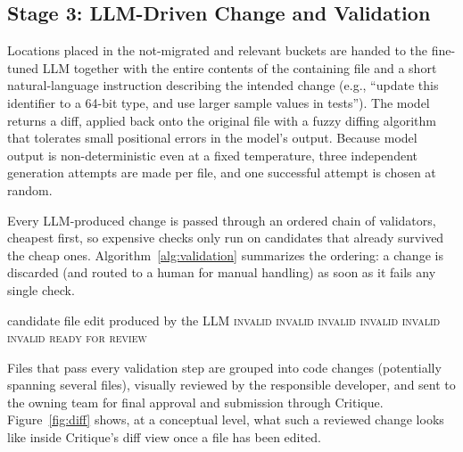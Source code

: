 \subsection{Stage 3: LLM-Driven Change and Validation}
Locations placed in the not-migrated and relevant buckets are handed
to the fine-tuned LLM together with the entire contents of the
containing file and a short natural-language instruction describing
the intended change (e.g., ``update this identifier to a 64-bit type,
and use larger sample values in tests''). The model returns a diff,
applied back onto the original file with a fuzzy diffing algorithm
that tolerates small positional errors in the model's output. Because
model output is non-deterministic even at a fixed temperature, three
independent generation attempts are made per file, and one successful
attempt is chosen at random.

Every LLM-produced change is passed through an ordered chain of
validators, cheapest first, so expensive checks only run on
candidates that already survived the cheap ones. Algorithm~\ref{alg:validation}
summarizes the ordering: a change is discarded (and routed to a human
for manual handling) as soon as it fails any single check.

\begin{algorithm}
\caption{Simplified change-validation pipeline based on Section 3.3 of the original paper.}
\label{alg:validation}
\begin{algorithmic}[1]
\Require candidate file edit produced by the LLM
  \State \Return \textsc{invalid}
  \State \Return \textsc{invalid}
  \State \Return \textsc{invalid}
  \State \Return \textsc{invalid}
  \State \Return \textsc{invalid}
  \State \Return \textsc{invalid}
\Else
  \State \Return \textsc{ready for review}
\EndIf
\end{algorithmic}
\end{algorithm}

Files that pass every validation step are grouped into code changes
(potentially spanning several files), visually reviewed by the
responsible developer, and sent to the owning team for final approval
and submission through Critique. Figure~\ref{fig:diff} shows, at a
conceptual level, what such a reviewed change looks like inside
Critique's diff view once a file has been edited.


